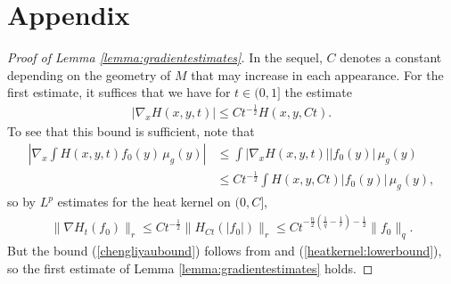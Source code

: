 \documentclass[12pt]{amsart}
\renewcommand{\1}{{\mathbf 1}}
\theoremstyle{others}
\numberwithin{equation}{section}
\begin{document}
\section{Appendix}
\begin{proof}[Proof of Lemma \ref{lemma:gradientestimates}]
     In the sequel, \(C\) denotes a constant depending on the geometry of \(M\) that may increase in each appearance. For the first estimate, it suffices that we have for \(t \in (0, 1]\) the estimate
    \begin{align}\label{chengliyaubound}
        |\nabla_x H(x, y, t)| \leq Ct^{-\frac{1}{2}} H\left(x, y, Ct\right).
    \end{align} To see that this bound is sufficient, note that
    \begin{align*}
        \left|\nabla_x \int H(x, y, t) f_0(y) \, \mu_g(y)\right| &\leq \int \left|\nabla_x H(x, y, t)\right| \left|f_0(y)\right| \, \mu_g(y) \\
        &\leq Ct^{-\frac{1}{2}}\int H(x, y, Ct) |f_0(y)| \, \mu_g(y),
    \end{align*} so by \(L^p\) estimates for the heat kernel on \((0, C]\),
    \begin{align*}
        \|\nabla H_t(f_0)\|_r \leq Ct^{-\frac{1}{2}} \|H_{Ct}(|f_0|)\|_r \leq Ct^{-\frac{n}{2}\left(\frac{1}{q}-\frac{1}{r}\right)-\frac{1}{2}}\|f_0\|_q.
    \end{align*} But the bound (\ref{chengliyaubound}) follows from \cite[Theorem 6]{chengliyauheatkernel} and (\ref{heatkernel:lowerbound}), so the first estimate of Lemma \ref{lemma:gradientestimates} holds.

\end{proof}
\end{document}
